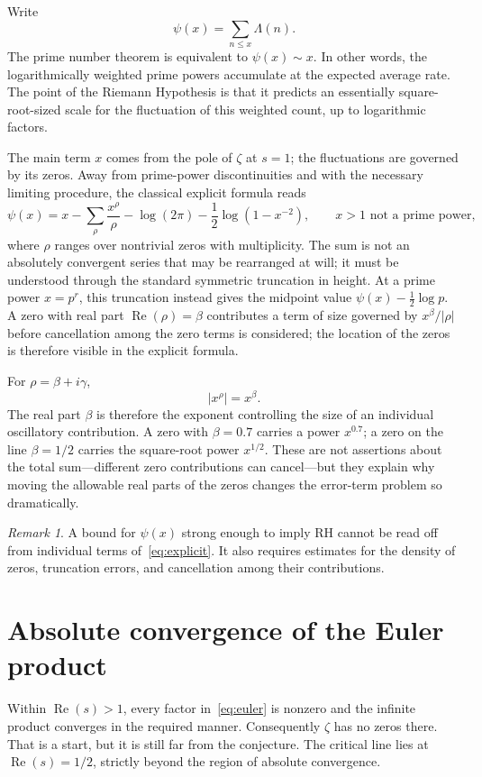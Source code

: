 \documentclass[11pt,openany,oneside]{scrbook}
\theoremstyle{definition}
\theoremstyle{remark}
\newtheorem{remark}[theorem]{Remark}
\newcommand{\Rea}{\operatorname{Re}}
\begin{document}
Write
\begin{equation}\label{eq:psi}
\psi(x)=\sum_{n\le x}\Lambda(n).
\end{equation}
The prime number theorem is equivalent to $\psi(x)\sim x$. In other words, the logarithmically weighted prime powers accumulate at the expected average rate. The point of the Riemann Hypothesis is that it predicts an essentially square-root-sized scale for the fluctuation of this weighted count, up to logarithmic factors.

The main term $x$ comes from the pole of $\zeta$ at $s=1$; the fluctuations are governed by its zeros. Away from prime-power discontinuities and with the necessary limiting procedure, the classical explicit formula reads
\begin{equation}\label{eq:explicit}
\psi(x)=x-\sum_{\rho}\frac{x^\rho}{\rho}-\log(2\pi)-\frac12\log(1-x^{-2}),\qquad x>1\text{ not a prime power},
\end{equation}
where $\rho$ ranges over nontrivial zeros with multiplicity. The sum is not an absolutely convergent series that may be rearranged at will; it must be understood through the standard symmetric truncation in height. At a prime power $x=p^r$, this truncation instead gives the midpoint value $\psi(x)-\tfrac12\log p$. A zero with real part $\Rea(\rho)=\beta$ contributes a term of size governed by $x^\beta/|\rho|$ before cancellation among the zero terms is considered; the location of the zeros is therefore visible in the explicit formula.

For $\rho=\beta+i\gamma$,
\[
\left|x^\rho\right|=x^\beta.
\]
The real part $\beta$ is therefore the exponent controlling the size of an individual oscillatory contribution. A zero with $\beta=0.7$ carries a power $x^{0.7}$; a zero on the line $\beta=1/2$ carries the square-root power $x^{1/2}$. These are not assertions about the total sum---different zero contributions can cancel---but they explain why moving the allowable real parts of the zeros changes the error-term problem so dramatically.

\begin{remark}
A bound for $\psi(x)$ strong enough to imply RH cannot be read off from individual terms of~\eqref{eq:explicit}. It also requires estimates for the density of zeros, truncation errors, and cancellation among their contributions.
\end{remark}

\section{Absolute convergence of the Euler product}
Within $\Rea(s)>1$, every factor in~\eqref{eq:euler} is nonzero and the infinite product converges in the required manner. Consequently $\zeta$ has no zeros there. That is a start, but it is still far from the conjecture. The critical line lies at $\Rea(s)=1/2$, strictly beyond the region of absolute convergence.
\end{document}
